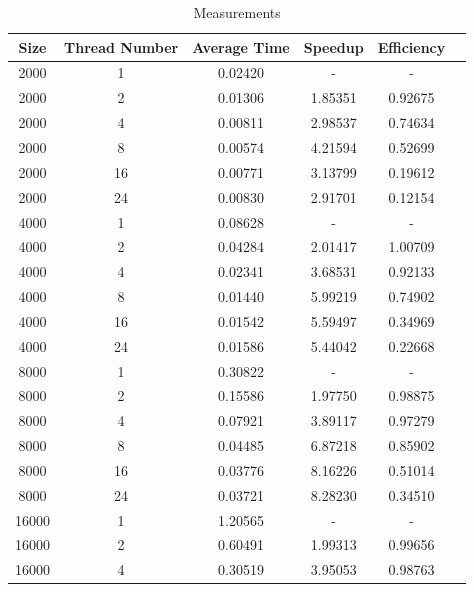 \documentclass{article}
\begin{document}
\begin{table}[htbp]
   \centering
   \caption{Measurements}
   \begin{tabular}{cccccc}
      \toprule
      Size  & Thread Number & Average Time & Speedup  & Efficiency \\
      \midrule
      2000  & 1             & 0.02420      & -        & -          \\
      2000  & 2             & 0.01306      & 1.85351  & 0.92675    \\
      2000  & 4             & 0.00811      & 2.98537  & 0.74634    \\
      2000  & 8             & 0.00574      & 4.21594  & 0.52699    \\
      2000  & 16            & 0.00771      & 3.13799  & 0.19612    \\
      2000  & 24            & 0.00830      & 2.91701  & 0.12154    \\
      \midrule
      4000  & 1             & 0.08628      & -        & -          \\
      4000  & 2             & 0.04284      & 2.01417  & 1.00709    \\
      4000  & 4             & 0.02341      & 3.68531  & 0.92133    \\
      4000  & 8             & 0.01440      & 5.99219  & 0.74902    \\
      4000  & 16            & 0.01542      & 5.59497  & 0.34969    \\
      4000  & 24            & 0.01586      & 5.44042  & 0.22668    \\
      \midrule
      8000  & 1             & 0.30822      & -        & -          \\
      8000  & 2             & 0.15586      & 1.97750  & 0.98875    \\
      8000  & 4             & 0.07921      & 3.89117  & 0.97279    \\
      8000  & 8             & 0.04485      & 6.87218  & 0.85902    \\
      8000  & 16            & 0.03776      & 8.16226  & 0.51014    \\
      8000  & 24            & 0.03721      & 8.28230  & 0.34510    \\
      \midrule
      16000 & 1             & 1.20565      & -        & -          \\
      16000 & 2             & 0.60491      & 1.99313  & 0.99656    \\
      16000 & 4             & 0.30519      & 3.95053  & 0.98763    \\

\end{tabular}
\end{table}
\end{document}
